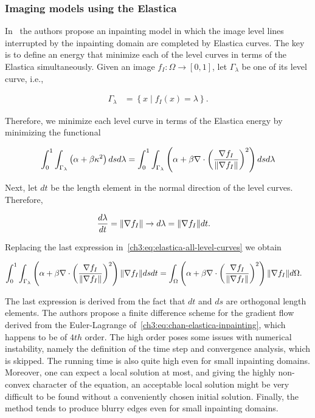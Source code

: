 \subsubsection{Imaging models using the Elastica}

In~\cite{chan02elasticainpainting} the authors propose an inpainting model in which the image level lines interrupted by the inpainting domain are completed by Elastica curves. The key is to define an energy that minimize each of the level curves in terms of the Elastica simultaneously. Given an image $f_I:\Omega \rightarrow [0,1]$, let $\Gamma_{\lambda}$ be one of its level curve, i.e.,

\begin{align*}
	\Gamma_{\lambda} &= \left\{ x \; | \; f_I(x)=\lambda \right\}.
\end{align*}

Therefore, we minimize each level curve in terms of the Elastica energy by minimizing the functional

\begin{align}
	\int_{0}^{1}{ \int_{\Gamma_{\lambda}}{ \left( \alpha + \beta \kappa ^2 \right) dsd\lambda}} = \int_{0}^{1}{ \int_{\Gamma_{\lambda}}{ \left(\alpha + \beta \nabla \cdot \left(\frac{\nabla f_I}{\lVert\nabla f_I\rVert}\right) ^2 \right) dsd\lambda}}
	\label{ch3:eq:elastica-all-level-curves}
\end{align}

Next, let $dt$ be the length element in the normal direction of the level curves. Therefore,

\begin{align*}
	\frac{d \lambda}{d t} &= \lVert\nabla f_I\rVert \rightarrow d\lambda = \lVert\nabla f_I\rVert dt.
\end{align*}

Replacing the last expression in~\cref{ch3:eq:elastica-all-level-curves} we obtain

\begin{align}
	\int_{0}^{1}{ \int_{\Gamma_{\lambda}}{ \left(\alpha + \beta \nabla \cdot \left(\frac{\nabla f_I}{\lVert\nabla f_I\rVert}\right) ^2 \right)\lVert\nabla f_I\rVert dsdt}} &= \int_{\Omega}{ \left(\alpha + \beta \nabla \cdot \left(\frac{\nabla f_I}{\lVert\nabla f_I\rVert}\right) ^2 \right)\lVert\nabla f_I\rVert d\Omega}.
	\label{ch3:eq:chan-elastica-inpainting}
\end{align}

The last expression is derived from the fact that $dt$ and $ds$ are orthogonal length elements. The authors propose a finite difference scheme for the gradient flow derived from the Euler-Lagrange of~\cref{ch3:eq:chan-elastica-inpainting}, which happens to be of $4th$ order. The high order poses some issues with numerical instability, namely the definition of the time step and convergence analysis, which is skipped. The running time is also quite high even for small inpainting domains. Moreover, one can expect a local solution at most, and giving the highly non-convex character of the equation, an acceptable local solution might be very difficult to be found without a conveniently chosen initial solution. Finally, the  method tends to produce blurry edges even for small inpainting domains. 

